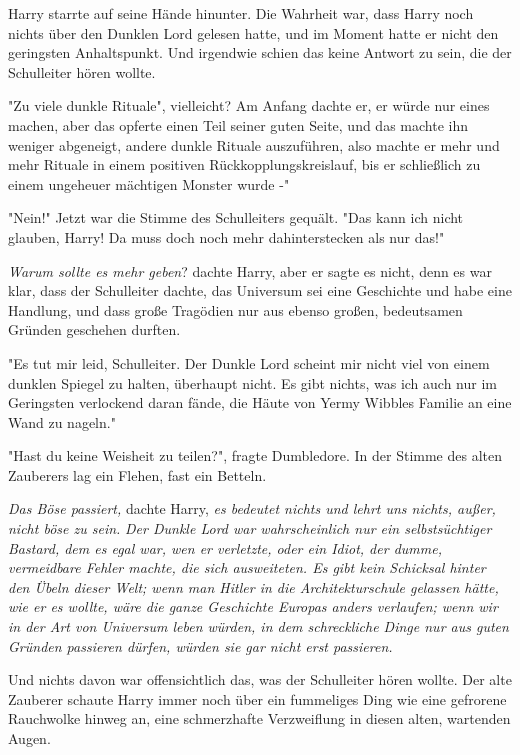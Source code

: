 {Harry starrte auf seine Hände hinunter. Die Wahrheit war, dass Harry noch nichts über den Dunklen Lord gelesen hatte, und im Moment hatte er nicht den geringsten Anhaltspunkt. Und irgendwie schien das keine Antwort zu sein, die der Schulleiter hören wollte.

"Zu viele dunkle Rituale", vielleicht? Am Anfang dachte er, er würde nur eines machen, aber das opferte einen Teil seiner guten Seite, und das machte ihn weniger abgeneigt, andere dunkle Rituale auszuführen, also machte er mehr und mehr Rituale in einem positiven Rückkopplungskreislauf, bis er schließlich zu einem ungeheuer mächtigen Monster wurde -"

"Nein!" Jetzt war die Stimme des Schulleiters gequält. "Das kann ich nicht glauben, Harry! Da muss doch noch mehr dahinterstecken als nur das!"

\emph{Warum sollte es mehr geben}? dachte Harry, aber er sagte es nicht, denn es war klar, dass der Schulleiter dachte, das Universum sei eine Geschichte und habe eine Handlung, und dass große Tragödien nur aus ebenso großen, bedeutsamen Gründen geschehen durften.

"Es tut mir leid, Schulleiter. Der Dunkle Lord scheint mir nicht viel von einem dunklen Spiegel zu halten, überhaupt nicht. Es gibt nichts, was ich auch nur im Geringsten verlockend daran fände, die Häute von Yermy Wibbles Familie an eine Wand zu nageln."

"Hast du keine Weisheit zu teilen?", fragte Dumbledore. In der Stimme des alten Zauberers lag ein Flehen, fast ein Betteln.

\emph{Das Böse passiert,} dachte Harry, \emph{es bedeutet nichts und lehrt uns nichts, außer, nicht böse zu sein.} \emph{Der Dunkle Lord war wahrscheinlich nur ein selbstsüchtiger Bastard, dem es egal war, wen er verletzte, oder ein Idiot, der dumme, vermeidbare Fehler machte, die sich ausweiteten. Es gibt kein Schicksal hinter den Übeln dieser Welt; wenn man Hitler in die Architekturschule gelassen hätte, wie er es wollte, wäre die ganze Geschichte Europas anders verlaufen; wenn wir in der Art von Universum leben würden, in dem schreckliche Dinge nur aus guten Gründen passieren dürfen, würden sie gar nicht erst passieren.}

Und nichts davon war offensichtlich das, was der Schulleiter hören wollte. Der alte Zauberer schaute Harry immer noch über ein fummeliges Ding wie eine gefrorene Rauchwolke hinweg an, eine schmerzhafte Verzweiflung in diesen alten, wartenden Augen.

}

